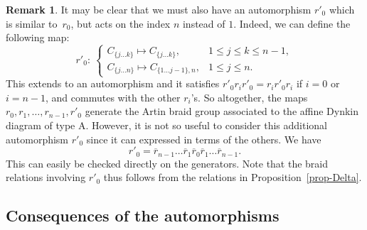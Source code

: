 \documentclass[10pt,a4paper]{amsart}
\numberwithin{equation}{section}
\theoremstyle{definition}
\newtheorem{rema}[theo]{Remark}
\newcommand{\rb}{\overline{r}}
\begin{document}
\begin{rema}
It may be clear that we must also have an automorphism $r'_0$ which is similar to~$r_0$, but acts on the index $n$ instead of $1$. Indeed, we can define the following map:
\[r'_0\colon \
\begin{cases}
C_{\{j\dots k\}}\mapsto C_{\{j\dots k\}} ,& 1\leq j\leq k\leq n-1, \\
C_{\{j\dots n\}}\mapsto C_{\{1\dots j-1\},n} ,& 1\leq j\leq n.
\end{cases}\]
This extends to an automorphism and it satisfies $r'_0r_ir'_0=r_ir'_0r_i$ if $i=0$ or $i=n-1$, and commutes with the other $r_i$'s. So altogether, the maps $r_0,r_1,\dots,r_{n-1},r'_0$ generate the Artin braid group associated to the affine Dynkin diagram of type A. However, it is not so useful to consider this additional automorphism $r'_0$ since it can expressed in terms of the others. We have
\[r'_0=\rb_{n-1}\dots \rb_1\rb_0\rb_1\dots \rb_{n-1} .\]
This can easily be checked directly on the generators. Note that the braid relations involving $r'_0$ thus follows from the relations in Proposition~\ref{prop-Delta}.
\end{rema}

\subsection{Consequences of the automorphisms}
\end{document}
